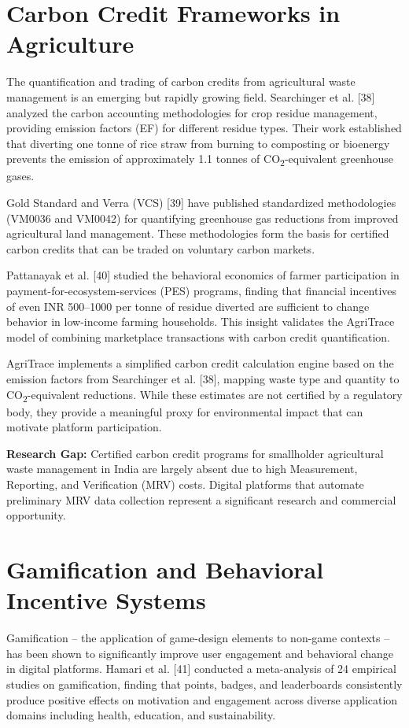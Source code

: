 \documentclass[a4paper,12pt,oneside]{report}
\begin{document}
\section{Carbon Credit Frameworks in Agriculture}

\noindent The quantification and trading of carbon credits from agricultural waste management is an emerging but rapidly growing field. Searchinger et al. [38] analyzed the carbon accounting methodologies for crop residue management, providing emission factors (EF) for different residue types. Their work established that diverting one tonne of rice straw from burning to composting or bioenergy prevents the emission of approximately 1.1 tonnes of CO\textsubscript{2}-equivalent greenhouse gases.

Gold Standard and Verra (VCS) [39] have published standardized methodologies (VM0036 and VM0042) for quantifying greenhouse gas reductions from improved agricultural land management. These methodologies form the basis for certified carbon credits that can be traded on voluntary carbon markets.

Pattanayak et al. [40] studied the behavioral economics of farmer participation in payment-for-ecosystem-services (PES) programs, finding that financial incentives of even INR 500--1000 per tonne of residue diverted are sufficient to change behavior in low-income farming households. This insight validates the AgriTrace model of combining marketplace transactions with carbon credit quantification.

AgriTrace implements a simplified carbon credit calculation engine based on the emission factors from Searchinger et al. [38], mapping waste type and quantity to CO\textsubscript{2}-equivalent reductions. While these estimates are not certified by a regulatory body, they provide a meaningful proxy for environmental impact that can motivate platform participation.

\textbf{Research Gap:} Certified carbon credit programs for smallholder agricultural waste management in India are largely absent due to high Measurement, Reporting, and Verification (MRV) costs. Digital platforms that automate preliminary MRV data collection represent a significant research and commercial opportunity.

\section{Gamification and Behavioral Incentive Systems}

\noindent Gamification -- the application of game-design elements to non-game contexts -- has been shown to significantly improve user engagement and behavioral change in digital platforms. Hamari et al. [41] conducted a meta-analysis of 24 empirical studies on gamification, finding that points, badges, and leaderboards consistently produce positive effects on motivation and engagement across diverse application domains including health, education, and sustainability.
\end{document}
